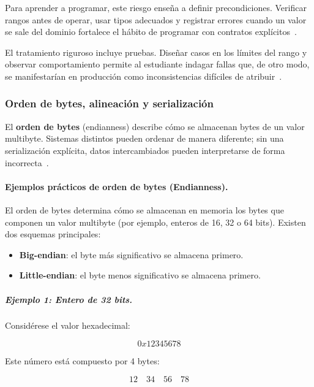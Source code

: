 \documentclass[12pt,twoside]{book}
\begin{document}
						Para aprender a programar, este riesgo enseña a definir precondiciones. Verificar rangos antes de operar, usar tipos adecuados y registrar errores cuando un valor se sale del dominio fortalece el hábito de programar con contratos explícitos~\cite{Hanly2015Problem,Pressman2019Software,Ghezzi2003Fundamentals}.
						
						El tratamiento riguroso incluye pruebas. Diseñar casos en los límites del rango y observar comportamiento permite al estudiante indagar fallas que, de otro modo, se manifestarían en producción como inconsistencias difíciles de atribuir~\cite{Sommerville2015Software,Gaddis2022Starting,ISO247722024Programming}.
						
					\subsubsection{Orden de bytes, alineación y serialización}
						\noindent
						El \textbf{orden de bytes} (endianness) describe cómo se almacenan bytes de un valor multibyte. Sistemas distintos pueden ordenar de manera diferente; sin una serialización explícita, datos intercambiados pueden interpretarse de forma incorrecta~\cite{Tanenbaum2021Structured,Silberschatz2018Operating,Laudon2020Management}.
						
						\paragraph{Ejemplos prácticos de orden de bytes (Endianness).} El orden de bytes determina cómo se almacenan en memoria los bytes que componen un valor multibyte (por ejemplo, enteros de 16, 32 o 64 bits). Existen dos esquemas principales:
						
						\begin{itemize}
							\item \textbf{Big-endian}: el byte más significativo se almacena primero.
							\item \textbf{Little-endian}: el byte menos significativo se almacena primero.
						\end{itemize}
						
						\subparagraph{Ejemplo 1: Entero de 32 bits.} Considérese el valor hexadecimal:
						
						\[
						0x12345678
						\]
						
						Este número está compuesto por 4 bytes:
						
						\[
						12 \quad 34 \quad 56 \quad 78
						\]
						
\end{document}
